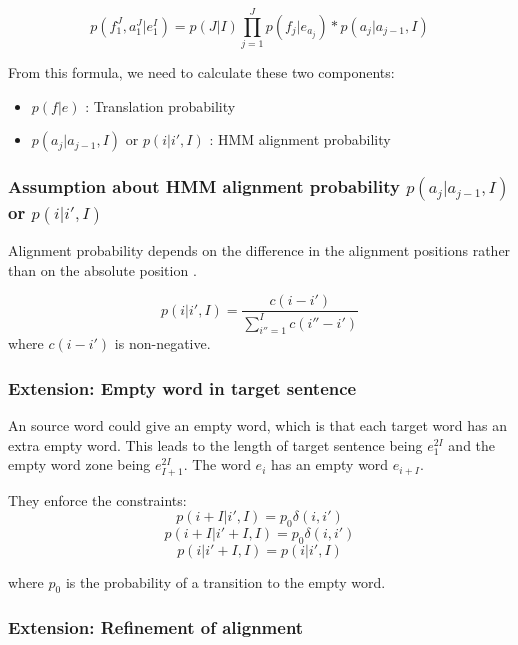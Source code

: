 \documentclass{article}
\begin{document}
\begin{equation}
p(f_1^J, a_1^J|e_1^I) = p(J|I) \prod_{j=1}^J p(f_j | e_{a_j}) * p(a_j | a_{j-1}, I)
\label{Och2003Systematic Alignment Model Equation}
\end{equation}

From this formula, we need to calculate these two components:
\begin{itemize}
\item $ p(f | e) $ : Translation probability
\item $p(a_j | a_{j-1}, I)$ or $p(i | i', I)$ : HMM alignment probability
\end{itemize}

\subsubsection{Assumption about HMM alignment probability $p(a_j | a_{j-1}, I)$ or $p(i | i', I)$}
Alignment probability depends on the difference in the alignment positions rather than on the absolute position \cite{Vogel1996HMM}.

\begin{equation}
p(i | i', I) = \frac{c(i - i')}{\sum_{i''=1}^I c(i'' - i')}
\end{equation}
where $c(i - i')$ is non-negative.

\subsubsection{Extension: Empty word in target sentence}
An source word could give an empty word, which is that each target word has an extra empty word. This leads to the length of target sentence being $e_{1}^{2I}$ and the empty word zone being $e_{I+1}^{2I}$. The word $e_{i}$ has an empty word $e_{i+I}$.

They enforce the constraints:
\begin{equation}
p(i + I | i', I) = p_{0} \delta(i, i')
\end{equation}
\begin{equation}
p(i + I | i' + I, I) = p_{0} \delta(i, i')
\end{equation}
\begin{equation}
p(i | i' + I, I) = p(i | i', I )
\end{equation}

where $p_{0}$ is the probability of a transition to the empty word.

\subsubsection{Extension: Refinement of alignment}
\end{document}
